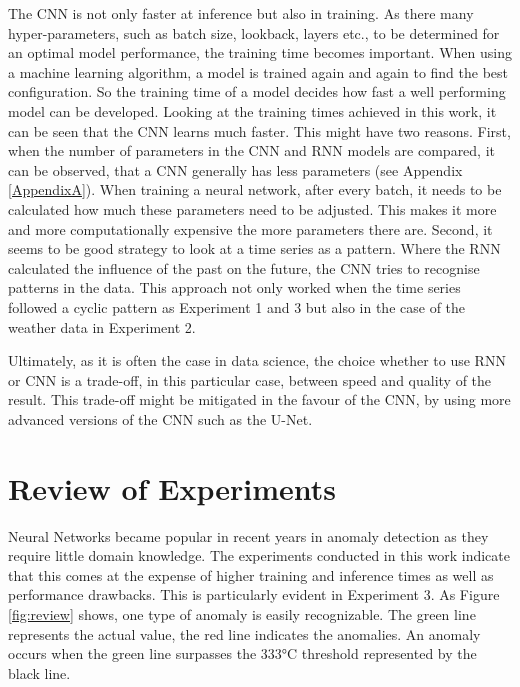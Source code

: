 The CNN is not only faster at inference but also in training. As there many hyper-parameters, such as batch size, lookback, layers etc., to be determined for an optimal model performance, the training time becomes important. When using a machine learning algorithm, a model is trained again and again to find the best configuration. So the training time of a model decides how fast a well performing model can be developed. Looking at the training times achieved in this work, it can be seen that the CNN learns much faster. This might have two reasons. First, when the number of parameters in the CNN and RNN models are compared, it can be observed, that a CNN generally has less parameters (see Appendix \ref{AppendixA}). When training a neural network, after every batch, it needs to be calculated how much these parameters need to be adjusted. This makes it more and more computationally expensive the more parameters there are. Second, it seems to be good strategy to look at a time series as a pattern. Where the RNN calculated the influence of the past on the future, the CNN tries to recognise patterns in the data. This approach not only worked when the time series followed a cyclic pattern as Experiment 1 and 3 but also in the case of the weather data in Experiment 2.     

Ultimately, as it is often the case in data science, the choice whether to use RNN or CNN is a trade-off, in this particular case, between speed and quality of the result. This trade-off might be mitigated in the favour of the CNN, by using more advanced versions of the CNN such as the U-Net.


\section{Review of Experiments}
Neural Networks became popular in recent years in anomaly detection as they require little domain knowledge. The experiments conducted in this work indicate that this comes at the expense of higher training and inference times as well as performance drawbacks. This is particularly evident in Experiment 3. As Figure \ref{fig:review} shows, one type of anomaly is easily recognizable. The green line represents the actual value, the red line indicates the anomalies. An anomaly occurs when the green line surpasses the 333°C threshold represented by the black line. 

